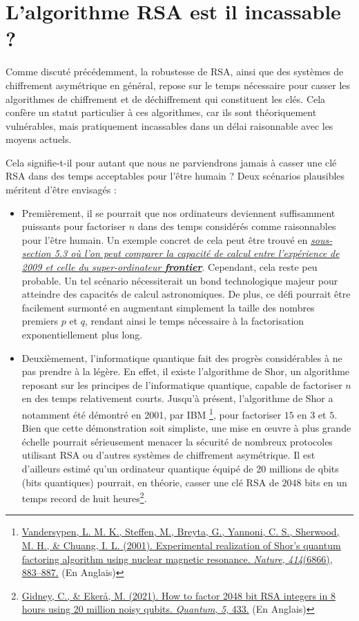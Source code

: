 \documentclass{article}
\begin{document}
\section{L'algorithme RSA est il incassable ?}\label{rsa-incassable}

Comme discuté précédemment, la robustesse de RSA, ainsi que des systèmes
de chiffrement asymétrique en général, repose sur le temps nécessaire
pour casser les algorithmes de chiffrement et de déchiffrement qui
constituent les clés. Cela confère un statut particulier à ces
algorithmes, car ils sont théoriquement vulnérables, mais pratiquement
incassables dans un délai raisonnable avec les moyens actuels.

Cela signifie-t-il pour autant que nous ne parviendrons jamais à casser
une clé RSA dans des temps acceptables pour l'être humain ? Deux
scénarios plausibles méritent d'être envisagés :

\begin{itemize}
	\item
	Premièrement, il se pourrait que nos ordinateurs deviennent
	suffisamment puissants pour factoriser \(n\) dans des temps considérés
	comme raisonnables pour l'être humain. Un exemple concret de cela peut
	être trouvé en
	\textit{\hyperref[attaque-par-factorisation]{sous-section 5.3 où l'on peut comparer la capacité de calcul entre l'expérience de 2009 et celle du super-ordinateur \textbf{frontier}}}. 
	Cependant, cela
	reste peu probable. Un tel scénario nécessiterait un bond
	technologique majeur pour atteindre des capacités de calcul
	astronomiques. De plus, ce défi pourrait être facilement surmonté en
	augmentant simplement la taille des nombres premiers \(p\) et \(q\),
	rendant ainsi le temps nécessaire à la factorisation exponentiellement
	plus long.
	\item
	Deuxièmement, l'informatique quantique fait des progrès considérables
	à ne pas prendre à la légère. En effet, il existe l'algorithme de
	Shor, un algorithme reposant sur les principes de l'informatique
	quantique, capable de factoriser \(n\) en des temps relativement
	courts. Jusqu'à présent, l'algorithme de Shor a notamment été démontré
	en 2001, par IBM
	\footnote{\href{https://doi.org/10.1038/414883a}{Vandersypen,
			L. M. K., Steffen, M., Breyta, G., Yannoni, C. S., Sherwood, M. H.,
			\& Chuang, I. L. (2001). Experimental realization of Shor's quantum
			factoring algorithm using nuclear magnetic resonance. \textit{Nature},
			\textit{414}(6866), 883--887.} (En Anglais)}, pour factoriser \(15\)
	en \(3\) et \(5\). Bien que cette démonstration soit simpliste, une
	mise en œuvre à plus grande échelle pourrait sérieusement menacer la
	sécurité de nombreux protocoles utilisant RSA ou d'autres systèmes de
	chiffrement asymétrique. Il est d'ailleurs estimé qu'un ordinateur
	quantique équipé de 20 millions de qbits (bits quantiques) pourrait,
	en théorie, casser une clé RSA de \(2048\) bits en un temps record de
	huit heures\footnote{\href{https://doi.org/10.22331/q-2021-04-15-433}{Gidney,
			C., \& Ekerå, M. (2021). How to factor 2048 bit RSA integers in 8
			hours using 20 million noisy qubits. \textit{Quantum}, \textit{5}, 433.}
		(En Anglais)}.
\end{itemize}
\end{document}
